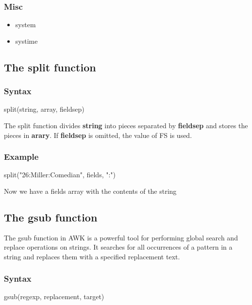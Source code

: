 \documentclass{report}
\begin{document}
    \bigbreak \noindent 
    \subsubsection{Misc}
    \begin{itemize}
        \item system
        \item systime
    \end{itemize}

    \bigbreak \noindent 
    \subsection{The split function}
    \bigbreak \noindent 
    \subsubsection{Syntax}
    \bigbreak \noindent 
    \begin{bashcode}
    split(string, array, fieldsep)
    \end{bashcode}
    \bigbreak \noindent 
    The split function divides \textbf{string} into pieces separated by \textbf{fieldsep} and stores the pieces in \textbf{arary}. If \textbf{fieldsep} is omitted, the value of FS is used.

    \bigbreak \noindent 
    \subsubsection{Example}
    \bigbreak \noindent 
    \begin{bashcode}
        split("26:Miller:Comedian", fields, ":")    
    \end{bashcode}
    \bigbreak \noindent 
    Now we have a fields array with the contents of the string

    \bigbreak \noindent 
    \subsection{The gsub function}
    \bigbreak \noindent 
    The gsub function in AWK is a powerful tool for performing global search and replace operations on strings. It searches for all occurrences of a pattern in a string and replaces them with a specified replacement text. 
    \bigbreak \noindent 
    \subsubsection{Syntax}
    \bigbreak \noindent 
    \begin{bashcode}
    gsub(regexp, replacement, target)
    \end{bashcode}
\end{document}
